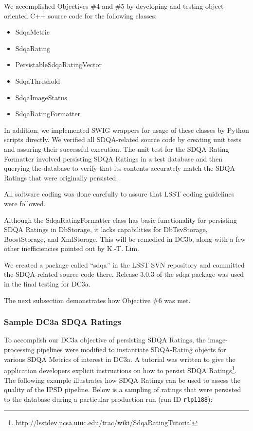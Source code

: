 We accomplished Objectives \#4 and \#5 by developing and testing object-oriented C++
source code for the following classes:

\begin{itemize}
\item{SdqaMetric}
\item{SdqaRating}
\item{PersistableSdqaRatingVector}
\item{SdqaThreshold}
\item{SdqaImageStatus}
\item{SdqaRatingFormatter}
\end{itemize}

\noindent
In addition, we implemented SWIG wrappers for usage of these classes
by Python scripts directly.  We verified all SDQA-related source code
by creating unit tests and assuring their successful execution.  The
unit test for the SDQA Rating Formatter involved persisting SDQA
Ratings in a test database and then querying the database to verify
that its contents accurately match the SDQA Ratings that were
originally persisted.

All software coding was done carefully to assure that LSST coding guidelines were followed.

Although the SdqaRatingFormatter class has basic functionality for persisting SDQA Ratings
in DbStorage, it lacks capabilities for DbTsvStorage, BoostStorage, and XmlStorage.  This
will be remedied in DC3b, along with a few other inefficiencies pointed out by K.-T. Lim.

We created a package called ``sdqa'' in the LSST SVN repository and committed the SDQA-related source code there.  Release 3.0.3 of the sdqa package was used in the 
final testing for DC3a.

The next subsection demonstrates how Objective \#6 was met.


\subsubsection{Sample DC3a SDQA Ratings}

To accomplish our DC3a objective of persisting SDQA Ratings, the
image-processing pipelines were modified to instantiate SDQA-Rating
objects for various SDQA Metrics of interest in DC3a.  A tutorial was
written to give the application developers explicit instructions on
how to persist SDQA
Ratings\footnote{http://lsstdev.ncsa.uiuc.edu/trac/wiki/SdqaRatingTutorial}.
The following example illustrates how SDQA Ratings can be used to
assess the quality of the IPSD pipeline.   Below is a sampling of
ratings that were persisted to the database during a particular
production run (run ID {\tt rlp1188}):

